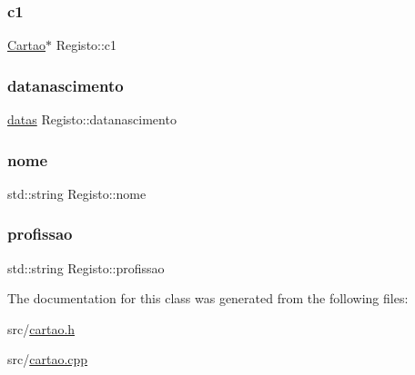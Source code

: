 \subsubsection{\texorpdfstring{c1}{c1}}
{\footnotesize\ttfamily \mbox{\hyperlink{class_cartao}{Cartao}}$\ast$ Registo\+::c1\hspace{0.3cm}{\ttfamily [private]}}

\mbox{\label{class_registo_ab95310053ffb7e2a07e45de4b3e8d62f}} 
\subsubsection{\texorpdfstring{datanascimento}{datanascimento}}
{\footnotesize\ttfamily \mbox{\hyperlink{structdatas}{datas}} Registo\+::datanascimento\hspace{0.3cm}{\ttfamily [private]}}

\mbox{\label{class_registo_a5f387f6835765cfebc7c292c8ca152dd}} 
\subsubsection{\texorpdfstring{nome}{nome}}
{\footnotesize\ttfamily std\+::string Registo\+::nome\hspace{0.3cm}{\ttfamily [private]}}

\mbox{\label{class_registo_aff4608d0155c0e50fbe8d2db6bdc8ec2}} 
\subsubsection{\texorpdfstring{profissao}{profissao}}
{\footnotesize\ttfamily std\+::string Registo\+::profissao\hspace{0.3cm}{\ttfamily [private]}}



The documentation for this class was generated from the following files\+:\begin{DoxyCompactItemize}
\item 
src/\mbox{\hyperlink{cartao_8h}{cartao.\+h}}\item 
src/\mbox{\hyperlink{cartao_8cpp}{cartao.\+cpp}}\end{DoxyCompactItemize}
